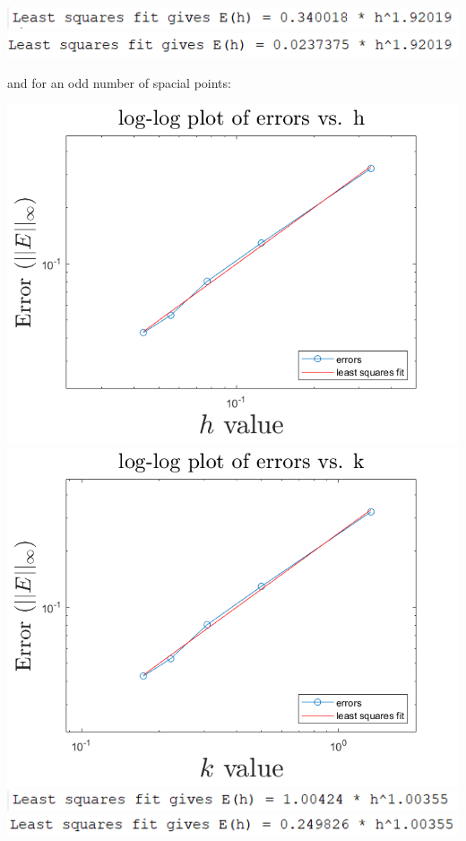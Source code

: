 \documentclass{article}
\begin{document}
\begin{itemize}
\begin{center}
        \newline
        \includegraphics[scale =0.6]{horderTRBDF2Gauss.PNG} 
        \includegraphics[scale =0.6]{kerrorderTRBDF2Gauss.PNG} 
    \end{center}
    and for an odd number of spacial points:
    \begin{center}
        \includegraphics[scale = 0.4]{trbdf2errorh.png}
        \includegraphics[scale = 0.4]{trbdf2errorkodd.png}
        \newline
        \includegraphics[scale = 0.6]{trbdf2orderh.PNG}
        \includegraphics[scale = 0.6]{trbdf2orderk.PNG}
    \end{center}
\end{itemize}
\end{document}
